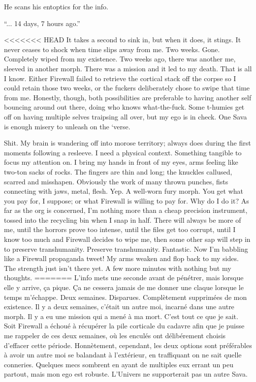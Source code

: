 He scans his entoptics for the info. 

``... 14 days, 7 hours ago.'' 

<<<<<<< HEAD
It takes a second to sink in, but when it does, it stings. It never ceases to shock when time slips away from me. Two weeks. Gone. Completely wiped from my existence. Two weeks ago, there was another me, sleeved in another morph. There was a mission and it led to my death. That is all I know. Either Firewall failed to retrieve the cortical stack off the corpse so I could retain those two weeks, or the fuckers deliberately chose to swipe that time from me. Honestly, though, both possibilities are preferable to having another self bouncing around out there, doing who knows what-the-fuck. Some t-humies get off on having multiple selves traipsing all over, but my ego is in check. One Sava is enough misery to unleash on the ‘verse. 

Shit. My brain is wandering off into morose territory; always does during the first moments following a resleeve. I need a physical context. Something tangible to focus my attention on. I bring my hands in front of my eyes, arms feeling like two-ton sacks of rocks. The fingers are thin and long; the knuckles callused, scarred and misshapen. Obviously the work of many thrown punches, fists connecting with jaws, metal, flesh. Yep. A well-worn fury morph. You get what you pay for, I suppose; or what Firewall is willing to pay for. Why do I do it? As far as the org is concerned, I'm nothing more than a cheap precision instrument, tossed into the recycling bin when I snap in half. There will always be more of me, until the horrors prove too intense, until the files get too corrupt, until I know too much and Firewall decides to wipe me, then some other sap will step in to preserve transhumanity. Preserve transhumanity. Fantastic. Now I'm babbling like a Firewall propaganda tweet! My arms weaken and flop back to my sides. The strength just isn't there yet. A few more minutes with nothing but my thoughts. 
=======
L'info mets une seconde avant de pénétrer, mais lorsque elle y arrive, ça pique. Ça ne cessera jamais de me donner une claque lorsque le temps m'échappe. Deux semaines. Disparues. Complètement supprimées de mon existence. Il y a deux semaines, c'était un autre moi, incarné dans une autre morph. Il y a eu une mission qui a mené à ma mort. C'est tout ce que je sait. Soit Firewall a échoué à récupérer la pile corticale du cadavre afin que je puisse me rappeler de ces deux semaines, où les enculés ont délibérement choisis d'effacer cette période. Honnètement, cependant, les deux options sont préférables à avoir un autre moi se balandant à l'extérieur, en traffiquant on ne sait quelle conneries. Quelques mecs sombrent en ayant de multiples eux errant un peu partout, mais mon ego est robuste. L'Univers ne supporterait pas un autre Sava. 

